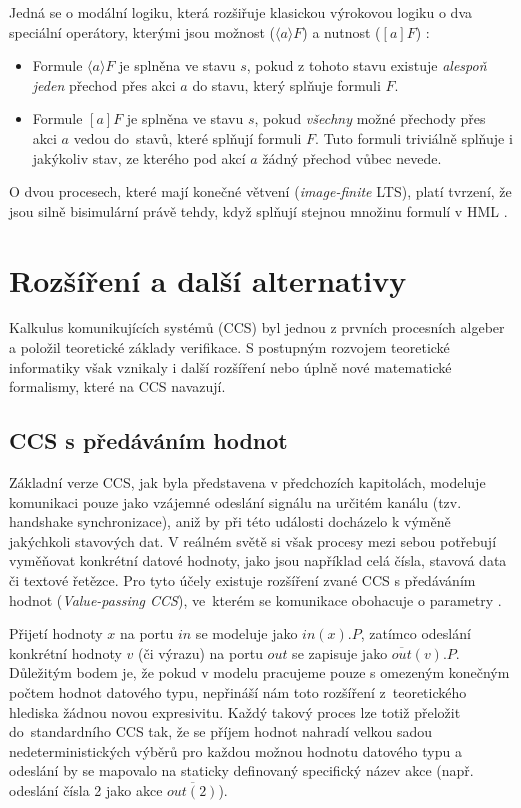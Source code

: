 Jedná se o modální logiku, která rozšiřuje klasickou výrokovou logiku o dva speciální operátory, kterými jsou možnost ($\langle a \rangle F$) a nutnost ($[a]F$) \cite{presentation1}:
\begin{itemize}
    \item Formule $\langle a \rangle F$ je splněna ve stavu $s$, pokud z tohoto stavu existuje \textit{alespoň jeden} přechod přes akci $a$ do stavu, který splňuje formuli $F$.
    \item Formule $[a]F$ je splněna ve stavu $s$, pokud \textit{všechny} možné přechody přes akci $a$ vedou do~stavů, které splňují formuli $F$. Tuto formuli triviálně splňuje i jakýkoliv stav, ze kterého pod akcí $a$ žádný přechod vůbec nevede.
\end{itemize}
O dvou procesech, které mají konečné větvení (\textit{image-finite} LTS), platí tvrzení, že jsou silně bisimulární právě tehdy, když splňují stejnou množinu formulí v HML \cite{aceto2007reactive}.

\section{Rozšíření a další alternativy}
Kalkulus komunikujících systémů (CCS) byl jednou z prvních procesních algeber a položil teoretické základy verifikace. 
S postupným rozvojem teoretické informatiky však vznikaly i další rozšíření nebo úplně nové matematické formalismy, které na CCS navazují.

\subsection{CCS s předáváním hodnot}
Základní verze CCS, jak byla představena v předchozích kapitolách, modeluje komunikaci pouze jako vzájemné odeslání signálu na určitém kanálu (tzv. handshake synchronizace), aniž by při této události docházelo k výměně jakýchkoli stavových dat. 
V reálném světě si však procesy mezi sebou potřebují vyměňovat konkrétní datové hodnoty, jako jsou například celá čísla, stavová data či textové řetězce.
Pro tyto účely existuje rozšíření zvané CCS s předáváním hodnot (\textit{Value-passing CCS}), ve~kterém se komunikace obohacuje o parametry \cite{presentation1}. 

Přijetí hodnoty $x$ na portu $in$ se modeluje jako $in(x).P$, zatímco odeslání konkrétní hodnoty $v$ (či výrazu) na portu $out$ se zapisuje jako $\overline{out}(v).P$. 
Důležitým bodem je, že pokud v modelu pracujeme pouze s omezeným konečným počtem hodnot datového typu, nepřináší nám toto rozšíření z~teoretického hlediska žádnou novou expresivitu.
Každý takový proces lze totiž přeložit do~standardního CCS tak, že se příjem hodnot nahradí velkou sadou nedeterministických výběrů pro každou možnou hodnotu datového typu a 
odeslání by se mapovalo na staticky definovaný specifický název akce (např. odeslání čísla 2 jako akce $\overline{out(2)}$).

